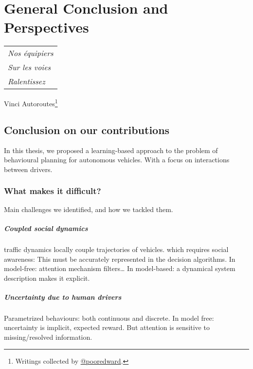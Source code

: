 
\makeatletter
\def\toclevel@chapter{-1}
\makeatother

\chapter{General Conclusion and Perspectives}
\label{chapter:conclusion}

\begin{flushright}
	\begin{tabular}{@{}l@{}}
		\emph{Nos équipiers}\\
		\emph{\hspace*{1.0cm}Sur les voies}\\
		\emph{\hspace*{0.5cm}Ralentissez}\\
	\end{tabular}

	Vinci Autoroutes\footnote{Writings collected by \href{https://twitter.com/pooredward/status/1273249408231124994}
		{@pooredward}.}\hspace*{1cm}
\end{flushright}

\section{Conclusion on our contributions}
In this thesis, we proposed a learning-based approach to the problem of behavioural planning for autonomous vehicles. With a focus on interactions between drivers.

\subsection{What makes it difficult?}
Main challenges we identified, and how we tackled them.

\paragraph{Coupled social dynamics}
traffic dynamics locally couple trajectories of vehicles. which requires social awareness: This must be accurately represented in the decision algorithms.
In model-free: attention mechanism filters…
In model-based: a dynamical system description makes it explicit.

\paragraph{Uncertainty due to human drivers}
Parametrized behaviours: both continuous and discrete. In model free: uncertainty is implicit, expected reward. But attention is sensitive to missing/resolved information.

